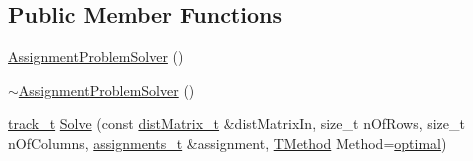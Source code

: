 \subsection*{Public Member Functions}
\begin{DoxyCompactItemize}
\item 
\mbox{\hyperlink{class_assignment_problem_solver_a13a83a34d4a0b4da872d87c79cb9c687}{Assignment\+Problem\+Solver}} ()
\item 
\mbox{\hyperlink{class_assignment_problem_solver_a47317b69e3eb9b50426c427ebcf5770f}{$\sim$\+Assignment\+Problem\+Solver}} ()
\item 
\mbox{\hyperlink{defines_8h_a7ce9c8817b42ab418e61756f579549ab}{track\+\_\+t}} \mbox{\hyperlink{class_assignment_problem_solver_a38198467ca647403c40be2c2bb47e177}{Solve}} (const \mbox{\hyperlink{_hungarian_alg_8h_af6ab0ee8259a51215f62e8f96416d5bb}{dist\+Matrix\+\_\+t}} \&dist\+Matrix\+In, size\+\_\+t n\+Of\+Rows, size\+\_\+t n\+Of\+Columns, \mbox{\hyperlink{_hungarian_alg_8h_ad7b9f569a9adbd958c668a36b6884ffd}{assignments\+\_\+t}} \&assignment, \mbox{\hyperlink{class_assignment_problem_solver_aec407eb73fed9d3ddb9467fde90a85e8}{T\+Method}} Method=\mbox{\hyperlink{class_assignment_problem_solver_aec407eb73fed9d3ddb9467fde90a85e8a84f2334f61866dba64befa6910848d75}{optimal}})
\end{DoxyCompactItemize}
